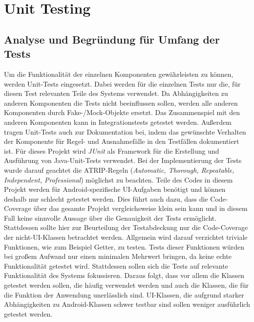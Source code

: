 \chapter{Unit Testing}

\section{Analyse und Begründung für Umfang der Tests}

Um die Funktionalität der einzelnen Komponenten gewährleisten zu können, werden Unit-Tests eingesetzt.
Dabei werden für die einzelnen Tests nur die, für diesen Test relevanten Teile des Systems verwendet.
Da Abhängigkeiten zu anderen Komponenten die Tests nicht beeinflussen sollen, werden alle anderen Komponenten durch Fake-/Mock-Objekte ersetzt.
Das Zusammenspiel mit den anderen Komponenten kann in Integrationstests getestet werden.
Außerdem tragen Unit-Tests auch zur Dokumentation bei, indem das gewünschte Verhalten der Komponente für Regel- und Ausnahmefälle in den Testfällen dokumentiert ist.
\newline
Für dieses Projekt wird \textit{JUnit} als Framework für die Erstellung und Ausführung von Java-Unit-Tests verwendet.
Bei der Implementierung der Tests wurde darauf geachtet die ATRIP-Regeln (\textit{Automatic, Thorough, Repeatable, Independent, Professional}) möglichst zu beachten.
\newline
Teile des Codes in diesem Projekt werden für Android-spezifische UI-Aufgaben benötigt und können deshalb nur schlecht getestet werden.
Dies führt auch dazu, dass die Code-Coverage über das gesamte Projekt vergleichsweise klein sein kann und in diesem Fall keine sinnvolle Aussage über die Genauigkeit der Tests ermöglicht.
Stattdessen sollte hier zur Beurteilung der Testabdeckung nur die Code-Coverage der nicht-UI-Klassen betrachtet werden.
\newline
Allgemein wird darauf verzichtet triviale Funktionen, wie zum Beispiel Getter, zu testen.
Tests dieser Funktionen würden bei großem Aufwand nur einen minimalen Mehrwert bringen, da keine \grqq echte\grqq{} Funktionalität getestet wird.
Stattdessen sollen sich die Tests auf relevante Funktionalität des Systems fokussieren.
Daraus folgt, dass vor allem die Klassen getestet werden sollen, die häufig verwendet werden und auch die Klassen, die für die Funktion der Anwendung unerlässlich sind.
UI-Klassen, die aufgrund starker Abhängigkeiten zu Android-Klassen schwer testbar sind sollen weniger ausführlich getestet werden.
\newline
